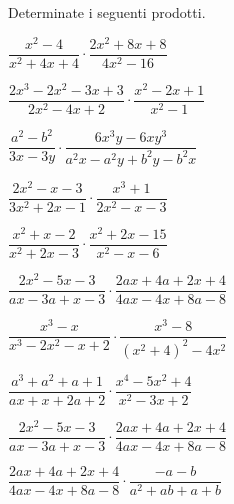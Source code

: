 \begin{esercizio}
\label{ese:19.16}
Determinate i seguenti prodotti.
\begin{multicols}{2}
\begin{enumeratea}
 \item \(\dfrac{x^{2}-4}{x^{2}+4x+4}\cdot \dfrac{2x^{2}+8x+8}{4x^{2}-16}\)
 \item 
\(\dfrac{2x^{3}-2x^{2}-3x+3}{2x^{2}-4x+2}\cdot{\dfrac{x^{2}-2x+1}{x^{2}-1}}\)
 \item \(\dfrac{a^{2}-b^{2}}{3x-3y}\cdot 
{\dfrac{6x^{3}y-6xy^{3}}{a^{2}x-a^{2}y+b^{2}y-b^{2}x}}\)
 \item \(\dfrac{2x^{2}-x-3}{3x^{2}+2x-1}\cdot {\dfrac{x^{3}+1}{2x^{2}-x-3}}\)
 \item \(\dfrac{x^{2}+x-2}{x^{2}+2x-3}\cdot {\dfrac{x^{2}+2x-15}{x^{2}-x-6}}\)
 \item \(\dfrac{2x^{2}-5x-3}{ax-3a+x-3}\cdot 
{\dfrac{2ax+4a+2x+4}{4ax-4x+8a-8}}\)
 \item \(\dfrac{x^{3}-x}{x^{3}-2x^{2}-x+2}\cdot 
{\dfrac{x^{3}-8}{\left(x^{2}+4\right)^{2}-4x^{2}}}\)
 \item \(\dfrac{a^{3}+a^{2}+a+1}{ax+x+2a+2}\cdot 
{\dfrac{x^{4}-5x^{2}+4}{x^{2}-3x+2}}\)
 \item \(\dfrac{2x^{2}-5x-3}{ax-3a+x-3}\cdot 
{\dfrac{2ax+4a+2x+4}{4ax-4x+8a-8}}\)
 \item \(\dfrac{2ax+4a+2x+4}{4ax-4x+8a-8}\cdot {\dfrac{-a-b}{a^{2}+ab+a+b}}\)
\end{enumeratea}
\end{multicols}
\end{esercizio}

\subsubsection*{}

